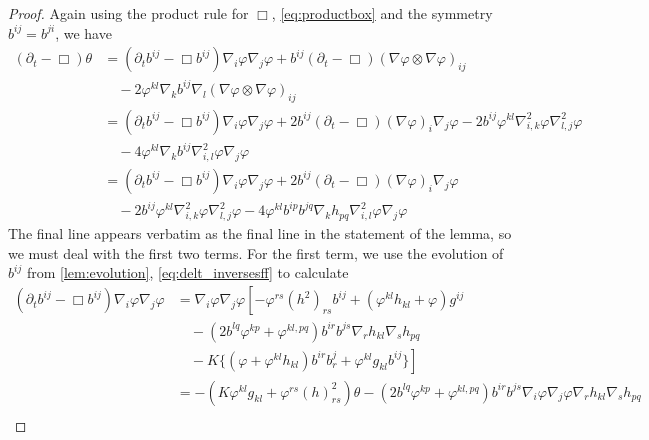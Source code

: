 \documentclass{amsart}
\begin{document}
\begin{proof}
Again using the product rule for \(\Box\), \cref{eq:productbox} and the symmetry \(b^{ij} = b^{ji}\), we have
\begin{equation}
\label{eq:delt_theta}
\begin{split}
(\partial_{t} - \Box)\theta &= (\partial_{t}b^{ij} - \Box b^{ij})\nabla_i \varphi\nabla_j\varphi + b^{ij} (\partial_{t} - \Box) (\nabla\varphi \otimes \nabla\varphi)_{ij} \\
&\quad - 2 \varphi^{kl} \nabla_k b^{ij} \nabla_l (\nabla \varphi \otimes \nabla\varphi)_{ij} \\
&= (\partial_{t}b^{ij} - \Box b^{ij})\nabla_i \varphi\nabla_j\varphi + 2 b^{ij} (\partial_{t} - \Box) (\nabla\varphi)_i \nabla_j\varphi - 2 b^{ij} \varphi^{kl} \nabla^2_{i,k} \varphi \nabla^2_{l,j} \varphi \\
&\quad - 4 \varphi^{kl} \nabla_k b^{ij} \nabla^2_{i,l} \varphi \nabla_j\varphi \\
&= (\partial_{t}b^{ij} - \Box b^{ij})\nabla_i \varphi\nabla_j\varphi + 2 b^{ij} (\partial_{t} - \Box) (\nabla\varphi)_i \nabla_j\varphi \\ 
&\quad - 2 b^{ij} \varphi^{kl} \nabla^2_{i,k} \varphi \nabla^2_{l,j} \varphi - 4 \varphi^{kl} b^{ip}b^{jq} \nabla_k h_{pq} \nabla^2_{i,l} \varphi \nabla_j\varphi 
\end{split}
\end{equation}
The final line appears verbatim as the final line in the statement of the lemma, so we must deal with the first two terms. For the first term, we use the evolution of \(b^{ij}\) from \cref{lem:evolution}, \cref{eq:delt_inversesff} to calculate
\begin{equation}
\label{eq:delt_theta1}
\begin{split}
(\partial_{t}b^{ij} - \Box b^{ij})\nabla_i \varphi\nabla_j\varphi &= \nabla_i \varphi \nabla_j \varphi\left[-\varphi^{rs} (h^2)_{rs} b^{ij} + (\varphi^{kl}h_{kl} + \varphi) g^{ij} \right. \\
& \quad - \left(2b^{lq}\varphi^{kp} + \varphi^{kl,pq}\right) b^{ir}b^{js} \nabla_r h_{kl} \nabla_s h_{pq} \\
& \quad - \left. K \{(\varphi + \varphi^{kl}h_{kl}) b^{ir}b^{j}_{r} + \varphi^{kl}g_{kl}b^{ij}\}\right] \\
&= - \left(K\varphi^{kl}g_{kl} + \varphi^{rs}(h)^2_{rs}\right) \theta - (2b^{lq}\varphi^{kp} + \varphi^{kl,pq}) b^{ir}b^{js}\nabla_i\varphi\nabla_j\varphi\nabla_rh_{kl}\nabla_s h_{pq} \\

\end{split}
\end{equation}
\end{proof}
\end{document}
